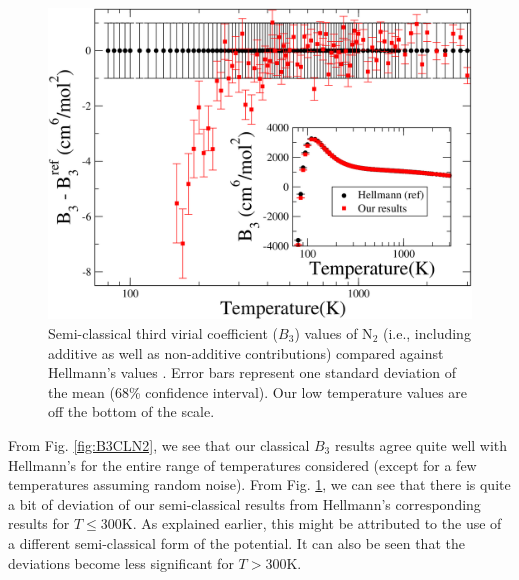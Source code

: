         \begin{figure}[!htbp]
            \centering
            \includegraphics[scale=0.20,keepaspectratio]{Chapter-5/Figures/B3N2SC9sResults.png}
            \caption{Semi-classical third virial coefficient ($B_3$) values of N$_2$ (i.e., including additive as well as non-additive contributions) compared against Hellmann's values \cite{Hellmann2013}. Error bars represent one standard deviation of the mean (68\% confidence interval). Our low temperature values are off the bottom of the scale.}
            \label{fig:B3SCN2}
        \end{figure}

        From Fig. \ref{fig:B3CLN2}, we see that our classical $B_3$ results agree quite well with Hellmann's for the entire range of temperatures considered (except for a few temperatures assuming random noise). From Fig. \ref{fig:B3SCN2}, we can see that there is quite a bit of deviation of our semi-classical results from Hellmann's corresponding results for $T \le 300$K. As explained earlier, this might be attributed to the use of a different semi-classical form of the \abinitio{} potential. It can also be seen that the deviations become less significant for $T > 300$K.

